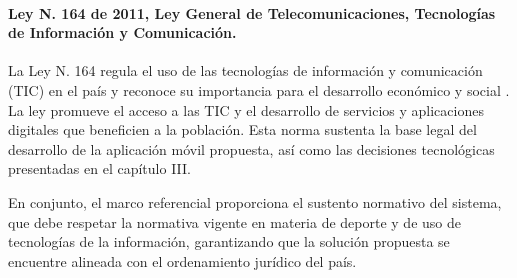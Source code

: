 \paragraph{Ley N.\textordmasculine{} 164 de 2011, Ley General de
Telecomunicaciones, Tecnolog\'ias de Informaci\'on y Comunicaci\'on.} La Ley
N.\textordmasculine{} 164 regula el uso de las tecnolog\'ias de informaci\'on y
comunicaci\'on (TIC) en el pa\'is y reconoce su importancia para el desarrollo
econ\'omico y social \citep{ley164}. La ley promueve el acceso a las TIC y el
desarrollo de servicios y aplicaciones digitales que beneficien a la
poblaci\'on. Esta norma sustenta la base legal del desarrollo de la aplicaci\'on
m\'ovil propuesta, as\'i como las decisiones tecnol\'ogicas presentadas en el
cap\'itulo III.

En conjunto, el marco referencial proporciona el sustento normativo del
sistema, que debe respetar la normativa vigente en materia de deporte y de uso
de tecnolog\'ias de la informaci\'on, garantizando que la soluci\'on propuesta se
encuentre alineada con el ordenamiento jur\'idico del pa\'is.
